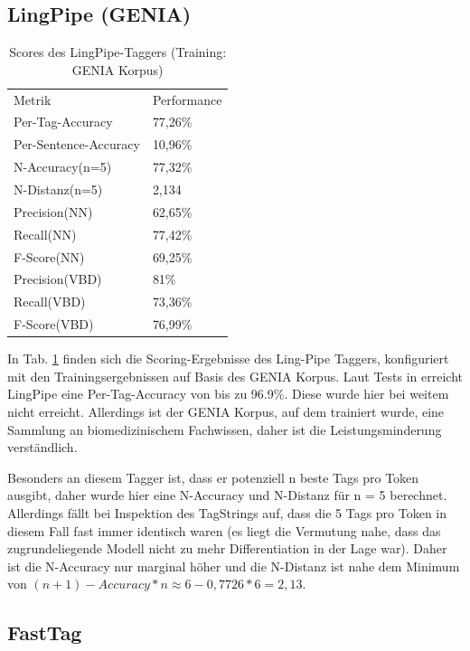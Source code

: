 \subsection{LingPipe (GENIA)}
\label{sec:eval:detail:lingpipe}

\begin{table}[htb]
\centering
\captionsetup{justification=centering,margin=2cm}
\begin{tabular}{l|l}
Metrik & Performance \\
\cline{1-2}
Per-Tag-Accuracy & 77,26\%\\
Per-Sentence-Accuracy & 10,96\%\\
\cline{1-2}
N-Accuracy(n=5) & 77,32\%\\
N-Distanz(n=5) & 2,134\\
\cline{1-2}
Precision(NN) & 62,65\%\\
Recall(NN) & 77,42\%\\
F-Score(NN) & 69,25\%\\
\cline{1-2}
Precision(VBD) & 81\%\\
Recall(VBD) & 73,36\%\\
F-Score(VBD) & 76,99\%
\end{tabular}
\vspace{3mm}
\caption{Scores des LingPipe-Taggers (Training: GENIA Korpus)}
\label{tab:eval:detail:lingpipe}
\end{table}

In Tab. \ref{tab:eval:detail:lingpipe} finden sich die Scoring-Ergebnisse des Ling-Pipe Taggers, konfiguriert mit den Trainingsergebnissen auf Basis des GENIA Korpus. Laut Tests in \cite{Lingpipeeval} erreicht LingPipe eine Per-Tag-Accuracy von bis zu 96.9\%. Diese wurde hier bei weitem nicht erreicht. Allerdings ist der GENIA Korpus, auf dem trainiert wurde, eine Sammlung an biomedizinischem Fachwissen, daher ist die Leistungsminderung verständlich. 

Besonders an diesem Tagger ist, dass er potenziell n beste Tags pro Token ausgibt, daher wurde hier eine N-Accuracy und N-Distanz für n = 5 berechnet. Allerdings fällt bei Inspektion des TagStrings auf, dass die 5 Tags pro Token in diesem Fall fast immer identisch waren (es liegt die Vermutung nahe, dass das zugrundeliegende Modell nicht zu mehr Differentiation in der Lage war). Daher ist die N-Accuracy nur marginal höher und die N-Distanz ist nahe dem Minimum von $(n+1)-Accuracy*n\approx 6-0,7726*6=2,13$.

\subsection{FastTag}
\label{sec:eval:detail:fasttag}


